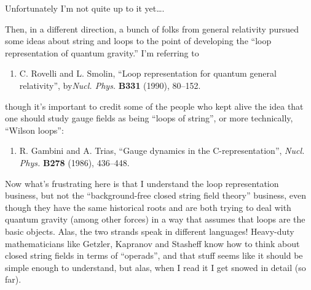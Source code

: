 \documentclass{article}
\def\tightlist{}
\renewcommand{\texttt}[1]{%
  \begingroup
  \ttfamily
  \begingroup\lccode`~=`/\lowercase{\endgroup\def~}{/\discretionary{}{}{}}%
  \begingroup\lccode`~=`[\lowercase{\endgroup\def~}{[\discretionary{}{}{}}%
  \begingroup\lccode`~=`.\lowercase{\endgroup\def~}{.\discretionary{}{}{}}%
  \catcode`/=\active\catcode`[=\active\catcode`.=\active
  \scantokens{#1\noexpand}%
  \endgroup
}
\begin{document}
\noindent
Unfortunately I'm not quite up to it yet\ldots.

Then, in a different direction, a bunch of folks from general relativity
pursued some ideas about string and loops to the point of developing the
``loop representation of quantum gravity.'' I'm referring to

\begin{enumerate}
\def\labelenumi{\arabic{enumi})}
\setcounter{enumi}{4}
\tightlist
\item
  C. Rovelli and L. Smolin,  ``Loop representation for quantum general relativity'', by\emph{Nucl. Phys.} \textbf{B331} (1990), 80--152.
\end{enumerate}
\noindent
though it's important to credit some of the people who kept alive the
idea that one should study gauge fields as being ``loops of string'', or
more technically, ``Wilson loops'':

\begin{enumerate}
\def\labelenumi{\arabic{enumi})}
\setcounter{enumi}{5}
\tightlist
\item
  R. Gambini and A. Trias, ``Gauge dynamics in the C-representation'', \emph{Nucl. Phys.} \textbf{B278} (1986),
   436--448.
\end{enumerate}

Now what's frustrating here is that I understand the loop representation
business, but not the ``background-free closed string field theory''
business, even though they have the same historical roots and are both
trying to deal with quantum gravity (among other forces) in a way that
assumes that loops are the basic objects. Alas, the two strands speak in
different languages! Heavy-duty mathematicians like Getzler, Kapranov
and Stasheff know how to think about closed string fields in terms of
``operads'', and that stuff seems like it should be simple enough to
understand, but alas, when I read it I get snowed in detail (so far).
\end{document}
